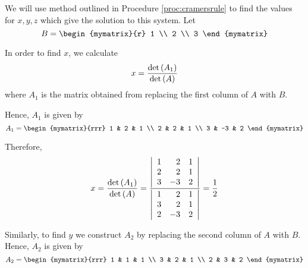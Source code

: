 \begin{solution} We will use method outlined in Procedure \ref{proc:cramersrule} to find the values for
$x,y,z$ which give the solution to this system. 
Let
\begin{equation*}
B = 
\begin{mymatrix}{r}
1 \\
2 \\
3
\end{mymatrix} 
\end{equation*}

In order to find $x$, we calculate
\begin{equation*}
x =
\vspace{0.05in}\frac{\det \left(A_{1}\right)}{\det \left(A\right)}
\end{equation*}
where $A_1$ is the matrix obtained from replacing the first column of $A$ with $B$.

Hence, $A_1$ is given by 
\begin{equation*}
A_1 = 
\begin{mymatrix}{rrr}
1 & 2 & 1 \\
2 & 2 & 1 \\
3 & -3 & 2
\end{mymatrix}
\end{equation*}

Therefore,
\begin{equation*}
x=
\vspace{0.05in}\frac{\det \left(A_{1}\right)}{\det \left(A\right)}
=
\vspace{0.05in}\frac{\left|
\begin{array}{rrr}
1 &  2 & 1 \\
2 &  2 & 1 \\
3 & -3 & 2
\end{array}
\right| }{\left|
\begin{array}{rrr}
1 & 2 & 1 \\
3 & 2 & 1 \\
2 & -3 & 2
\end{array}
\right| }=\vspace{0.05in}\frac{1}{2}
\end{equation*}

Similarly, to find $y$ we construct $A_2$ by replacing the second column of $A$ with $B$. Hence, $A_2$ is given by
\begin{equation*}
A_2
=
\begin{mymatrix}{rrr}
1 & 1 & 1 \\
3 & 2 & 1 \\
2 & 3 & 2
\end{mymatrix}
\end{equation*}


\end{solution}
